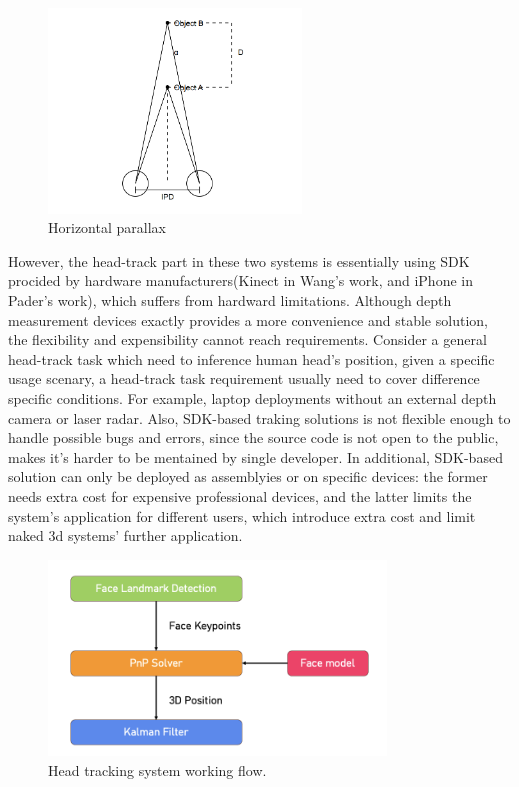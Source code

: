 \begin{figure}[htb]
    \centering
    \includegraphics[width=0.6\textwidth]{figures/Introduction/Horizontal.png}
    \caption{Horizontal parallax}\label{F:test-a}
\end{figure}

However, the head-track part in these two systems is essentially using SDK procided by hardware manufacturers(Kinect in Wang's work, and iPhone in Pader's work), which suffers from hardward limitations. Although depth measurement devices exactly provides a more convenience and stable solution, the flexibility and expensibility cannot reach requirements. Consider a general head-track task which need to inference human head's position, given a specific usage scenary, a head-track task requirement usually need to cover difference specific conditions. For example, laptop deployments without an external depth camera or laser radar. Also, SDK-based traking solutions is not flexible enough to handle possible bugs and errors, since the source code is not open to the public, makes it's harder to be mentained by single developer. In additional, SDK-based solution can only be deployed as assemblyies or on specific devices: the former needs extra cost for expensive professional devices, and the latter limits the system's application for different users, which introduce extra cost and limit naked 3d systems' further application.

\begin{figure}[htb]
    \centering
    \includegraphics[width=0.8\textwidth]{figures/Introduction/HeadTrack.png}
    \caption{Head tracking system working flow. }\label{F:test-a}
\end{figure}

